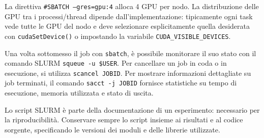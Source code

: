 \begin{warning}{}
    La direttiva \texttt{\#SBATCH --gres=gpu:4} alloca 4 GPU per nodo. 
    La distribuzione delle GPU tra i processi/thread dipende dall'implementazione: tipicamente ogni task vede tutte le GPU del nodo e deve selezionare esplicitamente quella desiderata con \texttt{cudaSetDevice()} o impostando la variabile \texttt{CUDA\_VISIBLE\_DEVICES}.
\end{warning}

Una volta sottomesso il job con \texttt{sbatch}, è possibile monitorare il suo stato con il comando SLURM \texttt{squeue -u \$USER}. 
Per cancellare un job in coda o in esecuzione, si utilizza \texttt{scancel JOBID}. 
Per mostrare informazioni dettagliate su job terminati, il comando \texttt{sacct -j JOBID} fornisce statistiche su tempo di esecuzione, memoria utilizzata e stato di uscita.

\begin{warning}{}
    Lo script SLURM è parte della documentazione di un esperimento: necessario per la riproducibilità. Conservare sempre lo script insieme ai risultati e al codice sorgente, specificando le versioni dei moduli e delle librerie utilizzate.
\end{warning}

